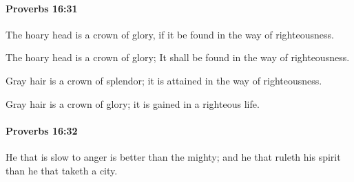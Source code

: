 		\paragraph{Proverbs 16:31} %
			\label{PROVERBS-16-31}

			The hoary head is a crown of glory, if it be found in the way of righteousness.

			\begin{versebox}
					\item[BHS] 
					\item[ASV] The hoary head is a crown of glory; It shall be found in the way of righteousness.
					\item[NIV] Gray hair is a crown of splendor; it is attained in the way of righteousness.
					\item[NRSV] Gray hair is a crown of glory; it is gained in a righteous life.
			\end{versebox}

		\paragraph{Proverbs 16:32} %
			\label{PROVERBS-16-32}

			He that is slow to anger is better than the mighty; and he that ruleth his spirit than he that taketh a city.

